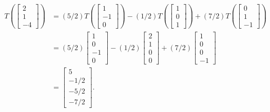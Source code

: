 \documentclass[12pt]{article}
\begin{document}
		\begin{align*}
		T \left( \begin{bmatrix}
		2 \\ 1 \\ -4
		\end{bmatrix} \right) &= (5/2) T \left( \begin{bmatrix}
		1 \\ -1 \\ 0
		\end{bmatrix} \right) - (1/2) T \left( \begin{bmatrix}
		1 \\ 0 \\ 1
		\end{bmatrix} \right) + (7/2) T \left( \begin{bmatrix}
		0 \\ 1 \\ -1
		\end{bmatrix} \right) \\
		&= (5/2) \begin{bmatrix}
		1 \\ 0 \\ -1 \\ 0
		\end{bmatrix} - (1/2) \begin{bmatrix}
		2 \\ 1 \\ 0 \\ 0
		\end{bmatrix} + (7/2) \begin{bmatrix}
		1 \\ 0 \\ 0 \\ -1
		\end{bmatrix} \\
		&= \left[\begin{matrix}5\\- 1/2 \\- 5/2 \\- 7/ 2
		\end{matrix}\right] .
		\end{align*}
		
	\newpage
	
\end{document}
